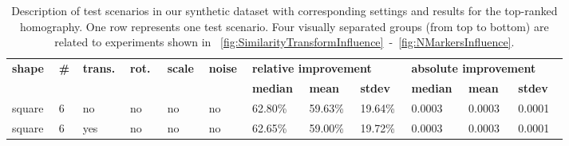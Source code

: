 \def\tblsccolw{0.06}
\def\tblrscolw{0.08}
\begin{table}[t]
    \caption[Description of syntehtic dataset scenarios]{Description of test scenarios in our synthetic dataset with corresponding settings and results for the top-ranked homography. One row represents one test scenario. Four visually separated groups (from top to bottom) are related to experiments shown in \figstr{}~\ref{fig:SimilarityTransformInfluence}~-~\ref{fig:NMarkersInfluence}.}
    \label{tab:TestScenariosResults}
    \setlength{\tabcolsep}{3pt}
    \begin{center}
        \footnotesize
        \begin{tabular}{p{\tblsccolw\linewidth}p{0.03\linewidth}p{\tblsccolw\linewidth}p{\tblsccolw\linewidth}p{\tblsccolw\linewidth}p{\tblsccolw\linewidth}|p{\tblrscolw\linewidth}p{\tblrscolw\linewidth}p{\tblrscolw\linewidth}p{\tblrscolw\linewidth}p{\tblrscolw\linewidth}p{\tblrscolw\linewidth}}
            \toprule
            \multirow{2}{2pt}{\textbf{shape}}  &
            \multirow{2}{2pt}{\textbf{\#}}     &
            \multirow{2}{2pt}{\textbf{trans.}} &
            \multirow{2}{2pt}{\textbf{rot.}}   &
            \multirow{2}{2pt}{\textbf{scale}}  &
            \multirow{2}{2pt}{\textbf{noise}}  & \multicolumn{3}{l}{\textbf{relative improvement}} & \multicolumn{3}{l}{\textbf{absolute improvement}}                                                                                                      \\
                                               &                                                   &                                                   &     &     &     & \textbf{median} & \textbf{mean} & \textbf{stdev} &
            \textbf{median}                    & \textbf{mean}                                     & \textbf{stdev}                                                                                                                                         \\
            \midrule
            square                             & 6                                                 & no                                                & no  & no  & no  & 62.80\%         & 59.63\%       & 19.64\%        & 0.0003  & 0.0003   & 0.0001   \\
            square                             & 6                                                 & yes                                               & no  & no  & no  & 62.65\%         & 59.00\%       & 19.72\%        & 0.0003  & 0.0003   & 0.0001   \\

\end{tabular}
\end{center}
\end{table}

